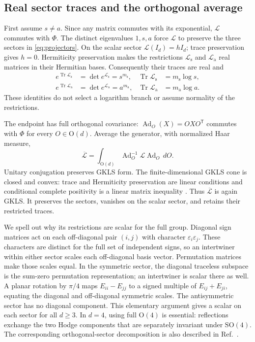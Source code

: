 \documentclass[11pt]{article}
\newcommand{\tr}{\operatorname{Tr}}
\newcommand{\Ad}{\operatorname{Ad}}
\newcommand{\OO}{\mathrm{O}}
\newcommand{\SO}{\mathrm{SO}}
\begin{document}
\subsection{Real sector traces and the orthogonal average}

First assume $s\ne a$. Since any matrix commutes with its exponential,
$\mathcal L$ commutes with $\Phi$. The distinct eigenvalues $1,s,a$
force $\mathcal L$ to preserve the three sectors in \eqref{eq:projectors}.
On the scalar sector $\mathcal L(I_d)=hI_d$; trace preservation gives
$h=0$. Hermiticity preservation makes the restrictions
$\mathcal L_{\mathrm{s}}$ and $\mathcal L_{\mathrm{a}}$ real matrices
in their Hermitian bases. Consequently their traces are real and
\begin{align}
 e^{\tr\mathcal L_{\mathrm{s}}}
 &=\det e^{\mathcal L_{\mathrm{s}}}=s^{m_{\mathrm{s}}},&
 \tr\mathcal L_{\mathrm{s}}&=m_{\mathrm{s}}\log s,\nonumber\\
 e^{\tr\mathcal L_{\mathrm{a}}}
 &=\det e^{\mathcal L_{\mathrm{a}}}=a^{m_{\mathrm{a}}},&
 \tr\mathcal L_{\mathrm{a}}&=m_{\mathrm{a}}\log a.  \label{eq:traces}
\end{align}
These identities do not select a logarithm branch or assume normality of
the restrictions.

The endpoint has full orthogonal covariance:
$\Ad_O(X)=OXO^{\mathsf T}$ commutes with $\Phi$ for every $O\in\OO(d)$.
Average the generator, with normalized Haar measure,
\begin{equation}
 \overline{\mathcal L}=
 \int_{\OO(d)}\Ad_O^{-1}\mathcal L\Ad_O\,dO.        \label{eq:average}
\end{equation}
Unitary conjugation preserves GKLS form. The finite-dimensional GKLS cone
is closed and convex: trace and Hermiticity preservation are linear
conditions and conditional complete positivity is a linear matrix
inequality \cite{Wolf2008,Bhat2023}. Thus $\overline{\mathcal L}$ is
again GKLS. It preserves the sectors, vanishes on the scalar sector, and
retains their restricted traces.

We spell out why its restrictions are scalar for the full group. Diagonal
sign matrices act on each off-diagonal pair $(i,j)$ with character
$\varepsilon_i\varepsilon_j$. These characters are distinct for the full
set of independent signs, so an intertwiner within either sector scales
each off-diagonal basis vector. Permutation matrices make those scales
equal. In the symmetric sector, the diagonal traceless subspace is the
sum-zero permutation representation; an intertwiner is scalar there as
well. A planar rotation by $\pi/4$ maps $E_{ii}-E_{jj}$ to a signed
multiple of $E_{ij}+E_{ji}$, equating the diagonal and off-diagonal
symmetric scales. The antisymmetric sector has no diagonal component.
This elementary argument gives a scalar on each sector for all $d\geq3$.
In $d=4$, using full $\OO(4)$ is essential: reflections exchange the two
Hodge components that are separately invariant under $\SO(4)$.
The corresponding orthogonal-sector decomposition is also described in
Ref.~\cite{Hashagen2018}.
\end{document}
